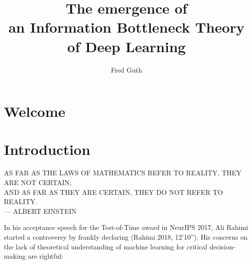 \documentclass[
  letterpaper,
  12pt,
  british]{tufte-book}
\title[\[~\]]{The emergence of\\
an Information Bottleneck Theory\\
of Deep Learning\\}
\author{Fred Guth}
\renewcommand{\textls}[2][5]{%
  \begingroup\addfontfeatures{LetterSpace=#1}#2\endgroup
}
\renewcommand{\allcaps}[1]{\textls[15]{\MakeTextUppercase{#1}}}
\newcommand{\epigraph}[2]{%
  \begin{fullwidth}
  \begin{flushright}
  \sffamily\fontsize{8}{10}\selectfont
  \sffamily\footnotesize
  \begin{doublespace}
  \vspace{-8cm}\noindent\allcaps{#1}\\%
  \noindent\allcaps{#2}\\%
  \end{doublespace}
  \vspace{5.1cm}
  \end{flushright}
  \end{fullwidth}
  \normalfont
}
\renewcommand*\contentsname{Table of contents}
\newcommand\contentsname{Table of contents}
\theoremstyle{plain}
\theoremstyle{definition}
\theoremstyle{plain}
\theoremstyle{remark}
\begin{document}
\frontmatter
\maketitle
% 
% 
% 
%  

\ifdefined\Shaded\renewenvironment{Shaded}{\begin{tcolorbox}[interior hidden, breakable, borderline west={3pt}{0pt}{shadecolor}, boxrule=0pt, frame hidden, sharp corners, enhanced]}{\end{tcolorbox}}\fi

\renewcommand*\contentsname{Contents}
{
\hypersetup{linkcolor=}
\setcounter{tocdepth}{1}
\tableofcontents
}
\mainmatter
{}

\hypertarget{welcome}{%
\chapter*{Welcome}\label{welcome}}



\hypertarget{introduction}{%
\chapter{Introduction}\label{introduction}}

\epigraph{As far as the laws of mathematics refer to reality, they are not certain; \\
 and as far as they are certain, they do not refer to reality.}{--- Albert Einstein}

In his acceptance speech for the Test-of-Time award in NeurIPS
2017, Ali
Rahimi started a controversy by
frankly declaring (Rahimi 2018,
12'10'').
His concerns on the lack of theoretical understanding of machine
learning for critical decision-making are rightful:
\end{document}
